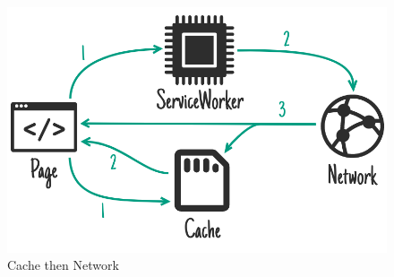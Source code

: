 \documentclass[11pt ,a4paper , twoside , openright ]{article}
\begin{document}
\begin{figure}[h]
	\centering
	\includegraphics[width=1\linewidth]{Strategia6}
	\caption{Cache then Network}
	\label{fig: Cache then Network}
\end{figure}
\end{document}
